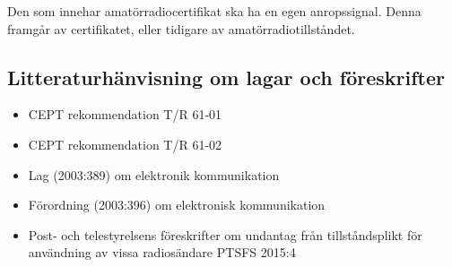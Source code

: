 Den som innehar amatörradiocertifikat ska ha en egen anropssignal.
Denna framgår av certifikatet, eller tidigare av amatörradiotillståndet.

\subsection{Litteraturhänvisning om lagar och föreskrifter}

\begin{itemize}
\item CEPT rekommendation T/R 61-01 \cite{TR6101}
\item CEPT rekommendation T/R 61-02 \cite{TR6102}
\item Lag (2003:389) om elektronik kommunikation \cite{SFS2003:389}
\item Förordning (2003:396) om elektronisk kommunikation \cite{SFS2003:396}
\item Post- och telestyrelsens föreskrifter om undantag från tillståndsplikt för
användning av vissa radiosändare PTSFS 2015:4 \cite{PTSFS2015:4}
\end{itemize}
